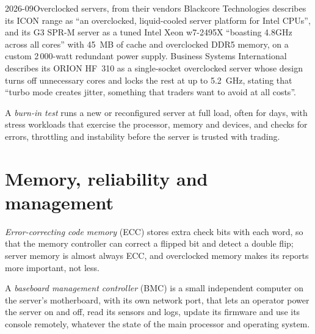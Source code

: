 \begin{dated}{2026-09}{Overclocked servers, from their vendors}\label{dat:nw:servers:oc}
Blackcore Technologies describes its ICON range as ``an overclocked, liquid-cooled server platform for Intel CPUs'', and its G3 SPR-M
server as a tuned Intel Xeon w7-2495X ``boasting 4.8GHz across all cores'' with 45~MB of cache and overclocked DDR5 memory, on a
custom 2\,000-watt redundant power supply. Business Systems International describes its ORION HF~310 as a single-socket overclocked server
whose design turns off unnecessary cores and locks the rest at up to 5.2~GHz, stating that ``turbo mode creates jitter, something that
traders want to avoid at all costs''.
\end{dated}

\begin{definition}\label{def:nw:servers:burnin}
A \emph{burn-in test} runs a new or reconfigured server at full load, often for days, with stress workloads that
exercise the processor, memory and devices, and checks for errors, throttling and instability before the server is trusted with
trading.
\end{definition}

\section{Memory, reliability and management}

\begin{definition}\label{def:nw:servers:ecc}
\emph{Error-correcting code memory} (ECC) stores extra check bits with each word, so that the memory
controller can correct a flipped bit and detect a double flip; server memory is almost always ECC, and overclocked memory makes its
reports more important, not less.
\end{definition}

\begin{definition}\label{def:nw:servers:bmc}
A \emph{baseboard management controller} (BMC) is a small independent computer on the server's
motherboard, with its own network port, that lets an operator power the server on and off, read its sensors and logs, update its firmware
and use its console remotely, whatever the state of the main processor and operating system.
\end{definition}

